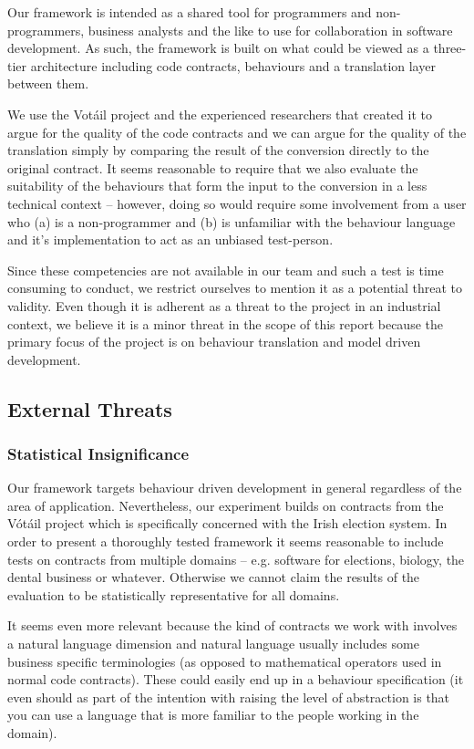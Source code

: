 Our framework is intended as a shared tool for programmers and non-programmers, business analysts and the like to use for collaboration in software development. As such, the framework is built on what could be viewed as a three-tier architecture including code contracts, behaviours and a translation layer between them.
 
We use the Votáil project and the experienced researchers that created it to argue for the quality of the code contracts and we can argue for the quality of the translation simply by comparing the result of the conversion directly to the original contract. It seems reasonable to require that we also evaluate the suitability of the behaviours that form the input to the conversion in a less technical context – however, doing so would require some involvement from a user who (a) is a non-programmer and (b) is unfamiliar with the behaviour language and it’s implementation to act as an unbiased test-person.

Since these competencies are not available in our team and such a test is time consuming to conduct, we restrict ourselves to mention it as a potential threat to validity. Even though it is adherent as a threat to the project in an industrial context, we believe it is a minor threat in the scope of this report because the primary focus of the project is on behaviour translation and model driven development.

\subsection{External Threats}
\label{sub:External Threats}

\subsubsection{Statistical Insignificance}
\label{sub:Statistical Insignificance}

Our framework targets behaviour driven development in general regardless of the area of application. Nevertheless, our experiment builds on contracts from the Vótáil project which is specifically concerned with the Irish election system. In order to present a thoroughly tested framework it seems reasonable to include tests on contracts from multiple domains – e.g. software for elections, biology, the dental business or whatever. Otherwise we cannot claim the results of the evaluation to be statistically representative for all domains.
 
It seems even more relevant because the kind of contracts we work with involves a natural language dimension and natural language usually includes some business specific terminologies (as opposed to mathematical operators used in normal code contracts). These could easily end up in a behaviour specification (it even should as part of the intention with raising the level of abstraction is that you can use a language that is more familiar to the people working in the domain).
 
